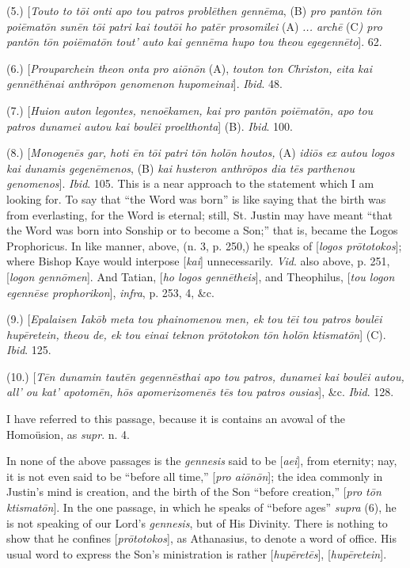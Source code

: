 (5.) [\emph{Touto to t\={o}i onti apo tou patros probl\={e}then
genn\={e}ma}, (B) \emph{pro pant\={o}n t\={o}n poi\={e}mat\={o}n
sun\={e}n t\={o}i patri kai tout\={o}i ho pat\={e}r
prosomilei} (A) \emph{... arch\={e}} (C\emph{) pro pant\={o}n t\={o}n
poi\={e}mat\={o}n tout' auto kai genn\={e}ma hupo tou theou
egegenn\={e}to}]. 62.

(6.) [\emph{Prouparchein theon onta pro ai\={o}n\={o}n} (A), \emph{touton
ton Christon, eita kai genn\={e}th\={e}nai anthr\={o}pon
genomenon hupomeinai}]. \emph{Ibid}. 48.

(7.) [\emph{Huion auton legontes, neno\={e}kamen, kai pro pant\={o}n
poi\={e}mat\={o}n, apo tou patros dunamei autou kai boul\={e}i
proelthonta}] (B). \emph{Ibid}. 100.

(8.) [\emph{Monogen\={e}s gar, hoti \={e}n t\={o}i patri t\={o}n
hol\={o}n houtos,} (A) \emph{idi\={o}s ex autou logos kai
dunamis gegen\={e}menos}, (B) \emph{kai husteron anthr\={o}pos
dia t\={e}s parthenou genomenos}]. \emph{Ibid}. 105. This is a
near approach to the statement which I am looking for. To say that
``the Word was born'' is like saying that the birth was from
everlasting, for the Word is eternal; still, St. Justin may have meant
``that the Word was born into Sonship or to become a Son;''
that is, became the Logos Prophoricus. In like manner, above, (n. 3,
p. 250,) he speaks of [\emph{logos pr\={o}totokos}]; where
Bishop Kaye would interpose [\emph{kai}] unnecessarily. \emph{Vid}.
also above, p. 251, [\emph{logon genn\={o}men}]. And Tatian, [\emph{ho
logos genn\={e}theis}], and Theophilus, [\emph{tou logon egenn\={e}se
prophorikon}], \emph{infra}, p. 253, 4, \&c.

(9.) [\emph{Epalaisen Iak\={o}b meta tou phainomenou men, ek tou t\={e}i
tou patros boul\={e}i hup\={e}retein, theou de, ek tou einai
teknon pr\={o}totokon t\={o}n hol\={o}n ktismat\={o}n}]
(C). \emph{Ibid}. 125.

(10.) [\emph{T\={e}n dunamin taut\={e}n gegenn\={e}sthai apo
tou patros, dunamei kai boul\={e}i autou, all' ou kat' apotom\={e}n,
h\={o}s apomerizomen\={e}s t\={e}s tou patros ousias}],
\&c. \emph{Ibid}. 128.

I have referred to this passage, because it is contains an avowal
of the Homoüsion, as \emph{supr}. n. 4.

In none of the above passages is the \emph{gennesis} said to be [\emph{aei}],
from eternity; nay, it is not even said to be ``before all
time,'' [\emph{pro ai\={o}n\={o}n}]; the idea commonly in
Justin's mind is creation, and the birth of the Son ``before
creation,'' [\emph{pro t\={o}n ktismat\={o}n}]. In the one
passage, in which he speaks of ``before ages'' \emph{supra}
(6), he is not speaking of our Lord's \emph{gennesis}, but of His
Divinity. There is nothing to show that he confines [\emph{pr\={o}totokos}],
as Athanasius, to denote a word of office. His usual word to express
the Son's ministration is rather [\emph{hup\={e}ret\={e}s}], [\emph{hup\={e}retein}].

